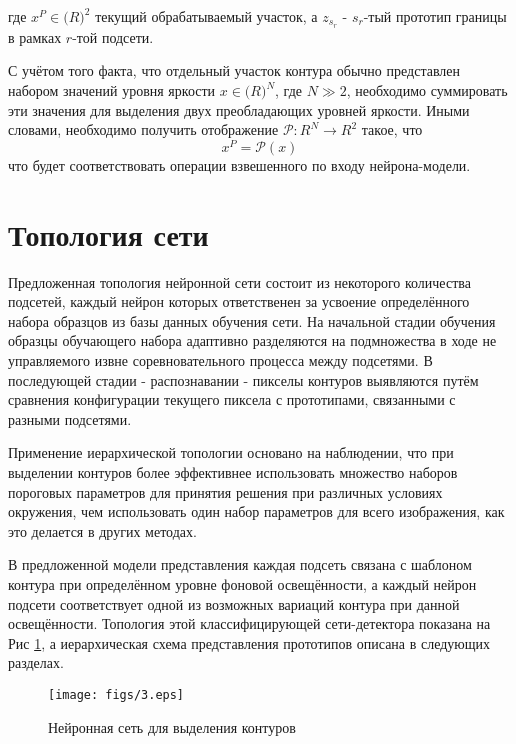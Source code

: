 \documentclass[a4paper,12pt]{report}
\begin{document}
где $x^P\in\mathbb(R)^2$ текущий обрабатываемый участок, а $z_{s_r}$ - $s_r$-тый прототип границы в рамках $r$-той подсети.

С учётом того факта, что отдельный участок контура обычно представлен набором значений уровня яркости $x\in\mathbb(R)^N$, где $N\gg2$, необходимо суммировать эти значения для выделения двух преобладающих уровней яркости. Иными словами, необходимо получить отображение $\mathcal{P}\colon R^N\to R^2$ такое,  что
\begin{equation}
x^P=\mathcal{P}(x)
\end{equation}
что будет соответствовать операции взвешенного по входу нейрона-модели.

\section{Топология сети}

Предложенная топология нейронной сети состоит из некоторого количества подсетей, каждый нейрон которых ответственен за усвоение определённого набора образцов из базы данных обучения сети. На начальной стадии обучения образцы обучающего набора адаптивно разделяются на подмножества в ходе не управляемого извне соревновательного процесса между подсетями. В последующей стадии - распознавании - пикселы контуров выявляются путём сравнения конфигурации текущего пиксела с прототипами, связанными с разными подсетями.
 
Применение иерархической топологии основано на наблюдении, что при выделении контуров более эффективнее использовать множество наборов пороговых параметров для принятия решения при различных условиях окружения, чем использовать один набор параметров для всего изображения, как это делается в других методах.
 
В предложенной модели представления каждая подсеть связана с шаблоном контура при определённом уровне фоновой освещённости, а каждый нейрон подсети соответствует одной из возможных вариаций контура при данной освещённости. Топология этой классифицирующей сети-детектора показана на Рис \ref{ednetwork}, а иерархическая схема представления прототипов описана в следующих разделах.

\begin{center}
\begin{figure}[!t]
\begin{center}
\texttt{[image: figs/3.eps]}
\end{center}\caption{Нейронная сеть для выделения контуров}
\label{ednetwork}
\end{figure}
\end{center}
\end{document}
